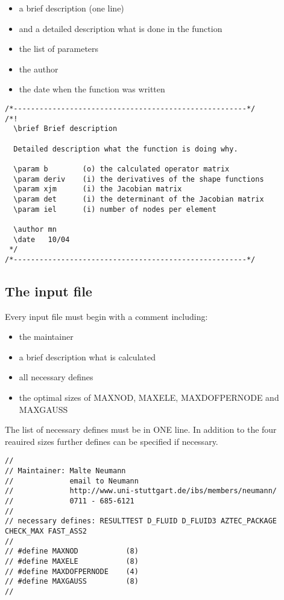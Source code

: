\begin{itemize}
\item a brief description (one line)
\item and a detailed description what is done in the function
\item the list of parameters
\item the author
\item the date when the function was written
\end{itemize}

\begin{verbatim}
/*------------------------------------------------------*/
/*!
  \brief Brief description

  Detailed description what the function is doing why.

  \param b        (o) the calculated operator matrix
  \param deriv    (i) the derivatives of the shape functions
  \param xjm      (i) the Jacobian matrix
  \param det      (i) the determinant of the Jacobian matrix
  \param iel      (i) number of nodes per element

  \author mn
  \date   10/04
 */
/*------------------------------------------------------*/
\end{verbatim}

\subsection{The input file}

Every input file must begin with a comment including: 

\begin{itemize}
\item the maintainer
\item a brief description what is calculated
\item all necessary defines
\item the optimal sizes of MAXNOD, MAXELE, MAXDOFPERNODE and MAXGAUSS
\end{itemize}

The list of necessary defines must be in ONE line. In addition to the
four reauired sizes further defines can be specified if necessary.  

\begin{verbatim}
//
// Maintainer: Malte Neumann
//             email to Neumann
//             http://www.uni-stuttgart.de/ibs/members/neumann/
//             0711 - 685-6121
//
// necessary defines: RESULTTEST D_FLUID D_FLUID3 AZTEC_PACKAGE CHECK_MAX FAST_ASS2
//
// #define MAXNOD           (8)
// #define MAXELE           (8)
// #define MAXDOFPERNODE    (4)
// #define MAXGAUSS         (8)
//
\end{verbatim}